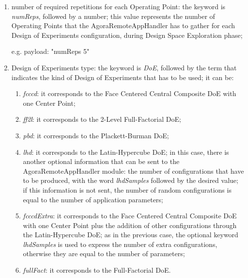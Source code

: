 \begin{enumerate}

    \item number of required repetitions for each Operating Point: the keyword is \textit{numReps}, followed by a number; this value represents the number of Operating Points that the AgoraRemoteAppHandler has to gather for each Design of Experiments configuration, during Design Space Exploration phase;
    
    e.g. payload: "numReps 5"
    
    \item Design of Experiments type: the keyword is \textit{DoE}, followed by the term that indicates the kind of Design of Experiments that has to be used; it can be:
    
    \begin{enumerate}
    
        \item \textit{fcccd}: it corresponds to the Face Centered Central Composite DoE with one Center Point;
        
        \item \textit{ff2l}: it corresponds to the 2-Level Full-Factorial DoE;
        
        \item \textit{pbd}: it corresponds to the Plackett-Burman DoE;
        
        \item \textit{lhd}: it corresponds to the Latin-Hypercube DoE; in this case, there is another optional information that can be sent to the AgoraRemoteAppHandler module: the number of configurations that have to be produced, with the word \textit{lhdSamples} followed by the desired value; if this information is not sent, the number of random configurations is equal to the number of application parameters;
        
        \item \textit{fcccdExtra}: it corresponds to the Face Centered Central Composite DoE with one Center Point plus the addition of other configurations through the Latin-Hypercube DoE; as in the previous case, the optional keyword \textit{lhdSamples} is used to express the number of extra configurations, otherwise they are equal to the number of parameters;
        
        \item \textit{fullFact}: it corresponds to the Full-Factorial DoE.
    
    \end{enumerate}
    

\end{enumerate}
